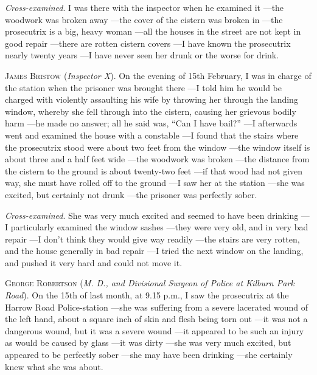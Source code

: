 {    \textit{Cross-examined}. I was there with the inspector when he examined it
    ---the woodwork was broken away
    ---the cover of the cistern was broken in
    ---the prosecutrix is a big, heavy woman
    ---all the houses in the street are not kept in good repair
    ---there are rotten cistern covers
    ---I have known the prosecutrix nearly twenty years
    ---I have never seen her drunk or the worse for drink.

    \textsc{James Bristow} (\textit{Inspector X}). On the evening of 15th February, I was in charge of the station when the prisoner was brought there
    ---I told him he would be charged with violently assaulting his wife by throwing her through the landing window, whereby she fell through into the cistern, causing her grievous bodily harm
    ---he made no answer; all he said was, ``Can I have bail?''
    ---I afterwards went and examined the house with a constable
    ---I found that the stairs where the prosecutrix stood were about two feet from the window
    ---the window itself is about three and a half feet wide
    ---the woodwork was broken
    ---the distance from the cistern to the ground is about twenty-two feet
    ---if that wood had not given way, she must have rolled off to the ground
    ---I saw her at the station
    ---she was excited, but certainly not drunk
    ---the prisoner was perfectly sober.

    \textit{Cross-examined}. She was very much excited and seemed to have been drinking
    ---I particularly examined the window sashes
    ---they were very old, and in very bad repair
    ---I don't think they would give way readily
    ---the stairs are very rotten, and the house generally in bad repair
    ---I tried the next window on the landing, and pushed it very hard and could not move it.

    \textsc{George Robertson} (\textit{M. D., and Divisional Surgeon of Police at Kilburn Park Road}). On the 15th of last month, at 9.15 p.m., I saw the prosecutrix at the Harrow Road Police-station
    ---she was suffering from a severe lacerated wound of the left hand, about a square inch of skin and flesh being torn out
    ---it was not a dangerous wound, but it was a severe wound
    ---it appeared to be such an injury as would be caused by glass
    ---it was dirty
    ---she was very much excited, but appeared to be perfectly sober
    ---she may have been drinking
    ---she certainly knew what she was about.

}
